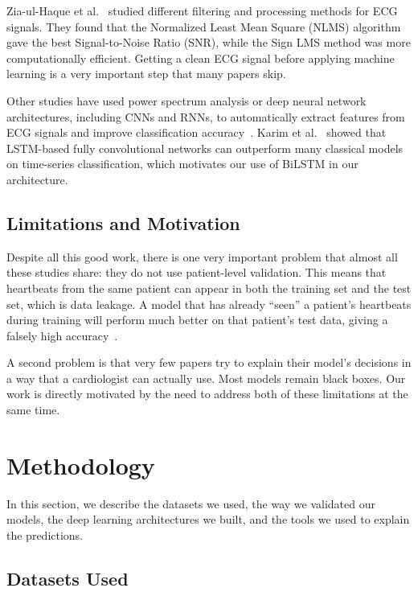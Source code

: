 \documentclass[10pt, twocolumn]{article}
\begin{document}
Zia-ul-Haque et al.~\cite{ziaulhaque2019} studied different filtering and processing methods
for ECG signals. They found that the Normalized Least Mean Square (NLMS) algorithm gave the
best Signal-to-Noise Ratio (SNR), while the Sign LMS method was more computationally
efficient. Getting a clean ECG signal before applying machine learning is a very important
step that many papers skip.

Other studies have used power spectrum analysis or deep neural network architectures,
including CNNs and RNNs, to automatically extract features from ECG signals and improve
classification accuracy~\cite{chen2017}.
Karim et al.~\cite{karim2018} showed that LSTM-based fully convolutional networks can
outperform many classical models on time-series classification, which motivates our use
of BiLSTM in our architecture.

\subsection{Limitations and Motivation}

Despite all this good work, there is one very important problem that almost all these studies
share: they do not use patient-level validation. This means that heartbeats from the same
patient can appear in both the training set and the test set, which is data leakage. A model
that has already ``seen'' a patient's heartbeats during training will perform much better on
that patient's test data, giving a falsely high accuracy~\cite{kapoor2023}.

A second problem is that very few papers try to explain their model's decisions in a way that
a cardiologist can actually use. Most models remain black boxes.
Our work is directly motivated by the need to address both of these limitations at the same time.

\section{Methodology}

In this section, we describe the datasets we used, the way we validated our models, the
deep learning architectures we built, and the tools we used to explain the predictions.

\subsection{Datasets Used}
\end{document}
